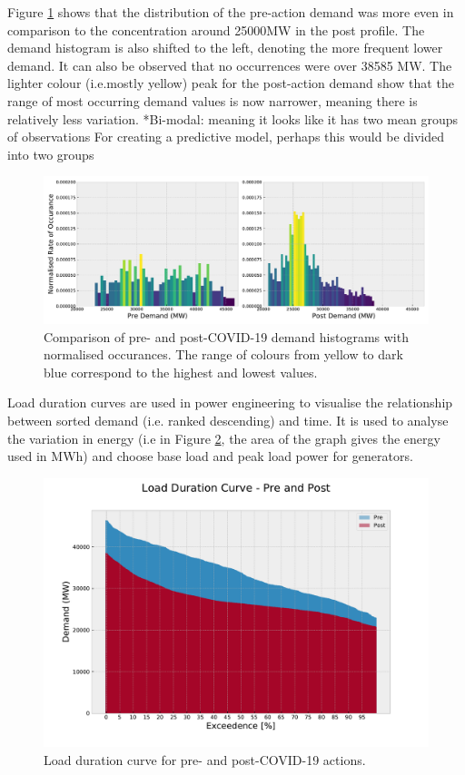 \documentclass[energies,article,submit,moreauthors,pdftex]{Definitions/mdpi}
\begin{document}
Figure \ref{fig:Demand_hist} shows that the distribution of the pre-action demand was more even in comparison to the concentration around 25000MW in the post profile. The demand histogram is also shifted to the left, denoting the more frequent lower demand. It can also be observed that no occurrences were over 38585 MW. The lighter colour (i.e.mostly yellow) peak for the post-action demand show that the range of most occurring demand values is now narrower, meaning there is relatively less variation.
*Bi-modal: meaning it looks like it has two mean groups of observations
For creating a predictive model, perhaps this would be divided into two groups

\begin{figure}[H] 
\centering
\hspace{-25pt}\includegraphics[width=16.5 cm]{Graphics/Demand_hist_coloured_sidebyside.pdf}
\caption{Comparison of pre- and post-COVID-19 demand histograms with normalised occurances. The range of colours from yellow to dark blue correspond to the highest and lowest values.}\label{fig:Demand_hist}
\end{figure}  

Load duration curves are used in power engineering to visualise the relationship between sorted demand (i.e. ranked descending) and time. It is used to analyse the variation in energy (i.e in Figure \ref{fig:load_duration}, the area of the graph gives the energy used in MWh) and choose base load and peak load power for generators.
\begin{figure}[b]
\centering
\hspace{-25pt}\includegraphics[width=9 cm]{Graphics/Load_duration_curve.pdf}
\caption{Load duration curve for pre- and post-COVID-19 actions.}\label{fig:load_duration}
\end{figure}  
\end{document}
